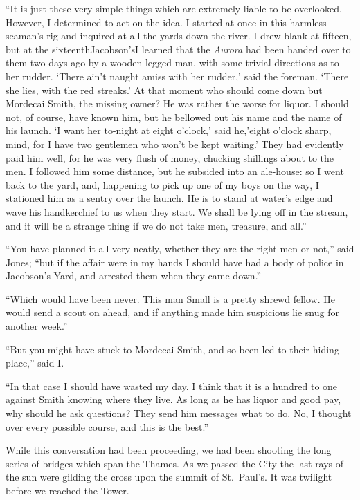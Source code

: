 \documentclass[12pt,english,oneside]{book}
\begin{document}
{}``It is just these very simple things which are extremely liable
to be overlooked. However, I determined to act on the idea. I started
at once in this harmless seaman's rig and inquired at all the yards
down the river. I drew blank at fifteen, but at the sixteenth\mdsh{---}Jacobson's\mdsh{---}I
learned that the \emph{Aurora} had been handed over to them two days
ago by a wooden-legged man, with some trivial directions as to her
rudder. `There ain't naught amiss with her rudder,' said the foreman.
`There she lies, with the red streaks.' At that moment who should
come down but Mordecai Smith, the missing owner? He was rather the
worse for liquor. I should not, of course, have known him, but he
bellowed out his name and the name of his launch. `I want her to-night
at eight o'clock,' said he,\mdsh{---}'eight o'clock sharp, mind,
for I have two gentlemen who won't be kept waiting.' They had evidently
paid him well, for he was very flush of money, chucking shillings
about to the men. I followed him some distance, but he subsided into
an ale-house: so I went back to the yard, and, happening to pick up
one of my boys on the way, I stationed him as a sentry over the launch.
He is to stand at water's edge and wave his handkerchief to us when
they start. We shall be lying off in the stream, and it will be a
strange thing if we do not take men, treasure, and all.''

{}``You have planned it all very neatly, whether they are the right
men or not,'' said Jones; {}``but if the affair were in my hands
I should have had a body of police in Jacobson's Yard, and arrested
them when they came down.''

{}``Which would have been never. This man Small is a pretty shrewd
fellow. He would send a scout on ahead, and if anything made him suspicious
lie snug for another week.''

{}``But you might have stuck to Mordecai Smith, and so been led to
their hiding-place,'' said I.

{}``In that case I should have wasted my day. I think that it is
a hundred to one against Smith knowing where they live. As long as
he has liquor and good pay, why should he ask questions? They send
him messages what to do. No, I thought over every possible course,
and this is the best.''

While this conversation had been proceeding, we had been shooting
the long series of bridges which span the Thames. As we passed the
City the last rays of the sun were gilding the cross upon the summit
of St.\ Paul's. It was twilight before we reached the Tower.
\end{document}
